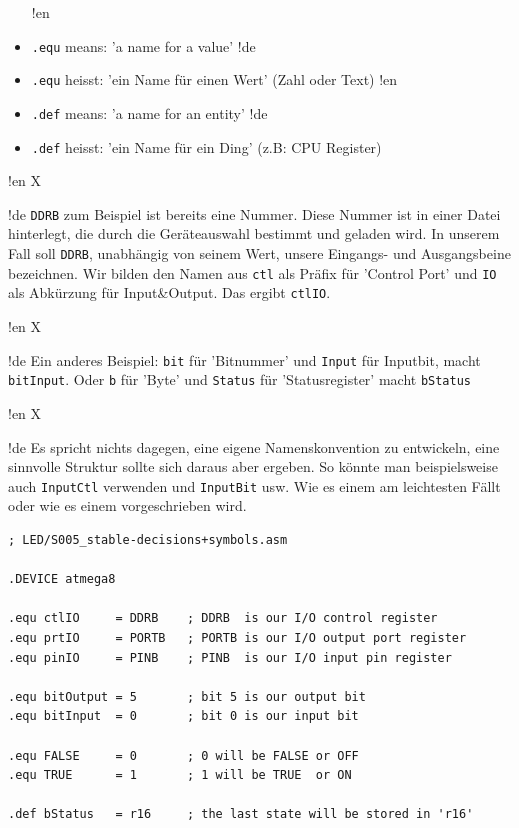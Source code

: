 \begin{itemize}
!en   \item \texttt{.equ} means: 'a name for a value'
!de   \item \texttt{.equ} heisst: 'ein Name für einen Wert' (Zahl oder Text)
!en   \item \texttt{.def} means: 'a name for an entity'
!de   \item \texttt{.def} heisst: 'ein Name für ein Ding' (z.B: CPU Register)
\end{itemize}



!en X

!de \texttt{DDRB} zum Beispiel ist bereits eine Nummer. Diese Nummer ist in einer Datei hinterlegt, die durch die Geräteauswahl bestimmt und geladen wird. In unserem Fall soll \texttt{DDRB}, unabhängig von seinem Wert, unsere Eingangs- und Ausgangsbeine bezeichnen. Wir bilden den Namen aus \texttt{ctl} als Präfix für 'Control Port' und \texttt{IO} als Abkürzung für Input\&Output. Das ergibt \texttt{ctlIO}.



!en X

!de Ein anderes Beispiel: \texttt{bit} für 'Bitnummer' und \texttt{Input} für Inputbit, macht \texttt{bitInput}. Oder \texttt{b} für 'Byte' und \texttt{Status} für 'Statusregister' macht \texttt{bStatus}



!en X

!de Es spricht nichts dagegen, eine eigene Namenskonvention zu entwickeln, eine sinnvolle Struktur sollte sich daraus aber ergeben. So könnte man beispielsweise auch \texttt{InputCtl} verwenden und \texttt{InputBit} usw. Wie es einem am leichtesten Fällt oder wie es einem vorgeschrieben wird.

\begin{lstlisting}
; LED/S005_stable-decisions+symbols.asm

.DEVICE atmega8

.equ ctlIO     = DDRB    ; DDRB  is our I/O control register
.equ prtIO     = PORTB   ; PORTB is our I/O output port register
.equ pinIO     = PINB    ; PINB  is our I/O input pin register

.equ bitOutput = 5       ; bit 5 is our output bit
.equ bitInput  = 0       ; bit 0 is our input bit

.equ FALSE     = 0       ; 0 will be FALSE or OFF
.equ TRUE      = 1       ; 1 will be TRUE  or ON

.def bStatus   = r16     ; the last state will be stored in 'r16'
\end{lstlisting}



